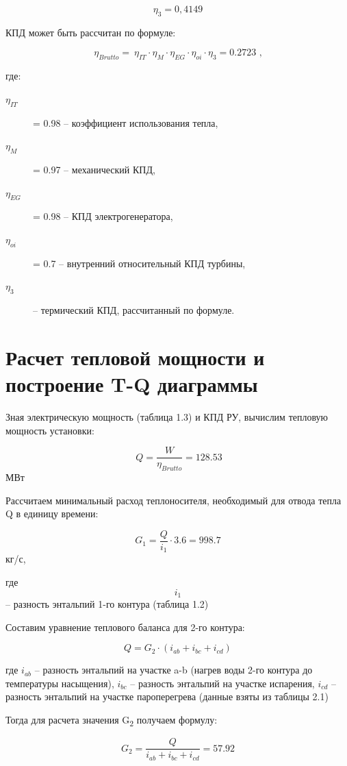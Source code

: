 \[\eta_{3} = 0,4149\]

КПД  может быть рассчитан по формуле:

\[\eta_{Brutto} = \ \eta_{IT} \cdot \eta_{M} \cdot \eta_{EG} \cdot \eta_{oi} \cdot \eta_{3} = 0.2723\textrm{ ,} \]

где: 
\begin{description}
	\item[$\eta_{IT}$] = 0.98 -- коэффициент использования тепла,
	\item[$\eta_{M}$] = 0.97 -- механический КПД,
	\item[$\eta_{EG}$] = 0.98 -- КПД электрогенератора,
	\item[$\eta_{oi}$] = 0.7 -- внутренний относительный КПД турбины,
	\item[$\eta_{3}$] -- термический КПД, рассчитанный по формуле.
\end{description}

\section{Расчет тепловой мощности и построение T-Q диаграммы}

Зная электрическую мощность (таблица 1.3) и КПД РУ, вычислим тепловую
мощность установки:

\[\ Q =\frac{W}{\eta_{Brutto}} = 128.53\] МВт

Рассчитаем минимальный расход теплоносителя, необходимый для отвода
тепла Q в единицу времени:



\[G_1 = \frac{Q}{{i}_{1}} \cdot 3.6 = 998.7\]кг/с,

где \[{i}_{1}\] -- разность энтальпий 1-го контура (таблица 1.2)

Составим уравнение теплового баланса для 2-го контура:

\begin{equation}
Q = G_2\cdot(i_{ab} + i_{bc} + i_{cd})
\end{equation}

где ${i}_{ab}$ -- разность энтальпий на участке a-b (нагрев
воды 2-го контура до температуры насыщения), ${i}_{bc}$ --
разность энтальпий на участке испарения, ${i}_{cd}$ -- разность
энтальпий на участке пароперегрева (данные взяты из таблицы 2.1)

Тогда для расчета значения G­\textsubscript{2} получаем формулу:

\begin{equation}
G_2 =\frac{Q}{{i}_{ab} + {i}_{bc} + {i}_{cd}} = 57.92
\end{equation}


